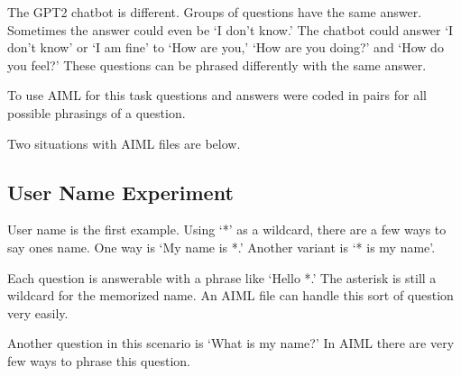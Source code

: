 The GPT2 chatbot is different. Groups of questions have the same answer. Sometimes the answer could even be `I don't know.' The chatbot could answer `I don't know' or `I am fine' to  `How are you,'  `How are you doing?' and `How do you feel?' These questions can be phrased differently with the same answer.

To use AIML for this task questions and answers were coded in pairs for all possible phrasings of a question.



Two situations with AIML files are below.

\subsection{User Name Experiment}
User name is the first example. Using `*' as a wildcard, there are a few ways to say ones name. One way is `My name is *.' Another variant is `* is my name'. %

Each question is answerable with a phrase like `Hello *.' The asterisk is still a wildcard for the memorized name. An AIML file can handle this sort of question very easily. %

Another question in this scenario is `What is my name?' In AIML there are very few ways to phrase this question. %

